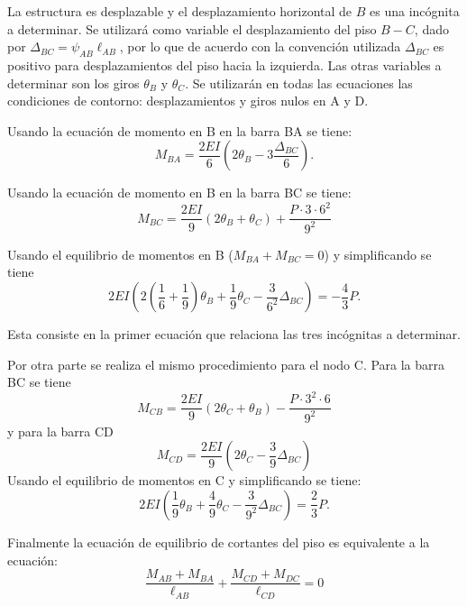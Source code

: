 La estructura es desplazable y el desplazamiento horizontal de $B$ es una incógnita a determinar. %
%
Se utilizará como variable el desplazamiento del piso $B-C$, dado por $\Delta_{BC} = \psi_{AB} \ell_{AB}$, por lo que de acuerdo con la convención utilizada $\Delta_{BC}$ es positivo para desplazamientos del piso hacia la izquierda.
Las otras variables a determinar son los giros $\theta_B$ y $\theta_C$. %
%
Se utilizarán en todas las ecuaciones las condiciones de contorno: desplazamientos y giros nulos en A y D.


Usando la ecuación de momento en B en la barra BA se tiene:
\begin{equation}
M_{BA} = \frac{2EI}{6} ( 2\theta_B - 3 \frac{ \Delta_{BC} } {6} ).
\end{equation}

Usando la ecuación de momento en B en la barra BC se tiene:
\begin{equation}
M_{BC} = \frac{2EI}{9} (2\theta_B +\theta_C ) + \frac{ P \cdot 3 \cdot 6^2}{9^2}
\end{equation}

Usando el equilibrio de momentos en B ($M_{BA}+M_{BC}=0$) y simplificando se tiene
\begin{equation}
\boxed{
	2EI \left( 2 \left( \frac{1}{6}+\frac{1}{9} \right) \theta_B + \frac{1}{9} \theta_C - \frac{3 }{6^2} \Delta_{BC} \right) = - \frac{4}{3} P.
}
\end{equation}

Esta consiste en la primer ecuación que relaciona las tres incógnitas a determinar.

Por otra parte se realiza el mismo procedimiento para el nodo C. Para la barra BC se tiene
\begin{equation}
M_{CB} = \frac{2EI}{9} (2\theta_C +\theta_B ) - \frac{P \cdot 3^2 \cdot 6}{9^2}
\end{equation}
y para la barra CD
\begin{equation}
M_{CD} = \frac{2EI}{9} (2\theta_C - \frac{3}{9} \Delta_{BC} )
\end{equation}
Usando el equilibrio de momentos en C y simplificando se tiene:
\begin{equation}
\boxed{
	2EI \left( \frac{1}{9} \theta_B + \frac{4}{9} \theta_C - \frac{3 }{9^2} \Delta_{BC} \right) = \frac{2}{3} P.
}
\end{equation}

Finalmente la ecuación de equilibrio de cortantes del piso es equivalente a la ecuación:
\begin{equation}
\frac{M_{AB}+M_{BA}}{\ell_{AB}}
+ 
\frac{M_{CD}+M_{DC}}{\ell_{CD}} = 0
\end{equation}

